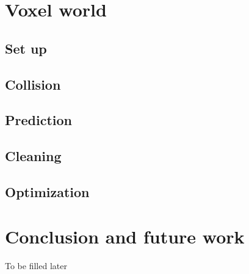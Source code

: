 \documentclass{scrartcl}
\begin{document}
\clearpage

\section{Voxel world}
\subsection{Set up}
\subsection{Collision}
\subsection{Prediction}
\subsection{Cleaning}
\subsection{Optimization}


\clearpage

\section{Conclusion and future work}
To be filled later


\printbibliography[heading=bibintoc]
\end{document}
